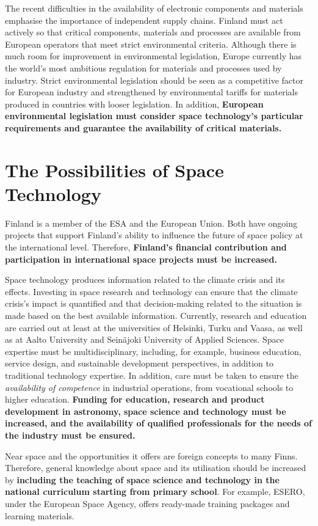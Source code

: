 \documentclass[nobib,finnish,oneside,openany,notoc,a4paper]{tufte-book}
\begin{document}
{The recent difficulties in the availability of electronic components and
materials emphasise the importance of independent supply chains. Finland
must act actively so that critical components, materials and processes
are available from European operators that meet strict environmental
criteria. Although there is much room for improvement in environmental
legislation, Europe currently has the world's most ambitious regulation
for materials and processes used by industry. Strict environmental
legislation should be seen as a competitive factor for European industry
and strengthened by environmental tariffs for materials produced in
countries with looser legislation. In addition, \textbf{European
environmental legislation must consider space technology's particular
requirements and guarantee the availability of critical materials.}

\chapter{The Possibilities of Space Technology}

Finland is a member of the ESA and the European Union. Both have ongoing
projects that support Finland's ability to influence the future of space
policy at the international level. Therefore, \textbf{Finland's
financial contribution and participation in international space projects
must be increased.}

Space technology produces information related to the climate crisis and
its effects. Investing in space research and technology can ensure that
the climate crisis's impact is quantified and that decision-making
related to the situation is made based on the best available
information. Currently, research and education are carried out at least
at the universities of Helsinki, Turku and Vaasa, as well as at Aalto
University and Seinäjoki University of Applied Sciences. Space expertise
must be multidisciplinary, including, for example, business education,
service design, and sustainable development perspectives, in addition to
traditional technology expertise. In addition, care must be taken to
ensure the \emph{availability of competence} in industrial operations,
from vocational schools to higher education. \textbf{Funding for
education, research and product development in astronomy, space science
and technology must be increased, and the availability of qualified
professionals for the needs of the industry must be ensured.}

Near space and the opportunities it offers are foreign concepts to many
Finns. Therefore, general knowledge about space and its utilisation
should be increased by \textbf{including the teaching of space science
and technology in the national curriculum starting from primary school}.
For example, ESERO, under the European Space Agency, offers ready-made
training packages and learning materials.

}
\end{document}
